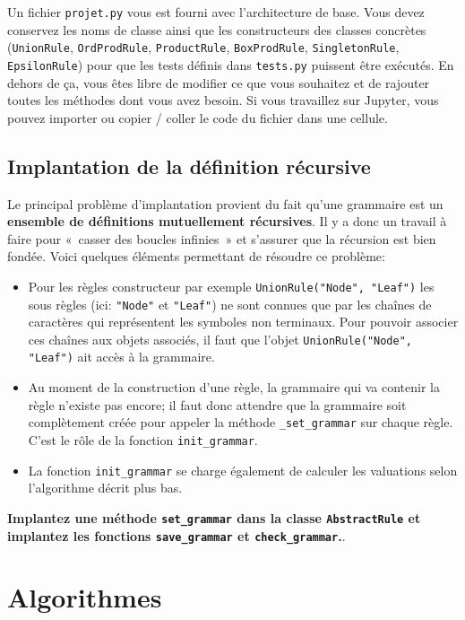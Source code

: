 \documentclass[11pt]{article}
\renewcommand{\emph}[1]{\textbf{#1}}
\begin{document}
Un fichier {\tt projet.py} vous est fourni avec l'architecture de base. Vous 
devez conservez les noms de classe ainsi que les constructeurs des classes
concrètes ({\tt UnionRule}, {\tt OrdProdRule}, {\tt ProductRule}, {\tt BoxProdRule},
{\tt SingletonRule}, {\tt EpsilonRule}) pour que les tests définis dans {\tt tests.py}
puissent être exécutés. En dehors de ça, vous êtes libre de modifier ce que vous souhaitez
et de rajouter toutes les méthodes dont vous avez besoin. Si vous travaillez
sur Jupyter, vous pouvez importer ou copier / coller le code du fichier dans une cellule.

\subsection{Implantation de la définition récursive}

Le principal problème d'implantation provient du fait qu'une grammaire est un
\emph{ensemble de définitions mutuellement récursives}. Il y a donc un travail
à faire pour «~casser des boucles infinies~» et s'assurer que la récursion est
bien fondée. Voici quelques éléments permettant de résoudre ce problème:
\begin{itemize}
\item Pour les règles constructeur par exemple
  \verb+UnionRule("Node", "Leaf")+ les sous règles (ici: \verb+"Node"+ et
  \verb+"Leaf"+) ne sont connues que par les chaînes de caractères qui
  représentent les symboles non terminaux. Pour pouvoir associer ces chaînes
  aux objets associés, il faut que l'objet \verb+UnionRule("Node", "Leaf")+
  ait accès à la grammaire.
\item Au moment de la construction d'une règle, la grammaire qui va contenir
  la règle n'existe pas encore; il faut donc attendre que la grammaire soit
  complètement créée pour appeler la méthode \texttt{\_set\_grammar} sur
  chaque règle. C'est le rôle de la fonction \texttt{init\_grammar}.
\item La fonction \texttt{init\_grammar} se charge également de calculer les
  valuations selon l'algorithme décrit plus bas.
\end{itemize}
\medskip

\textbf{Implantez une méthode {\tt set\_grammar} dans la classe {\tt AbstractRule}
et implantez les fonctions {\tt save\_grammar} et {\tt check\_grammar}.}.


\section{Algorithmes}
\label{seq:algo}
\end{document}
